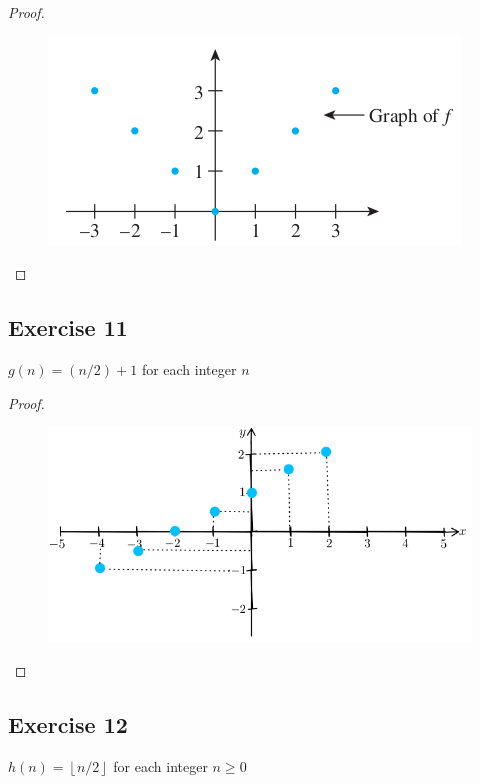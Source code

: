 \documentclass[14pt]{extarticle}
\newcommand{\floor}[1]{{\left\lfloor#1\right\rfloor}}
\begin{document}
\begin{proof}
    \begin{figure}[ht!]
        \centering
        \includegraphics[scale=0.5]{../images/11.1.10.png}
    \end{figure}
\end{proof}

\subsection{Exercise 11}
\(g(n) = (n/2) + 1\) for each integer \(n\)

\begin{proof}
    \begin{figure}[ht!]
        \centering
        \includegraphics[scale=0.5]{../images/11.1.11.png}
    \end{figure}
\end{proof}

\subsection{Exercise 12}
\(h(n) = \floor{n/2}\) for each integer \(n \geq 0\)
\end{document}
